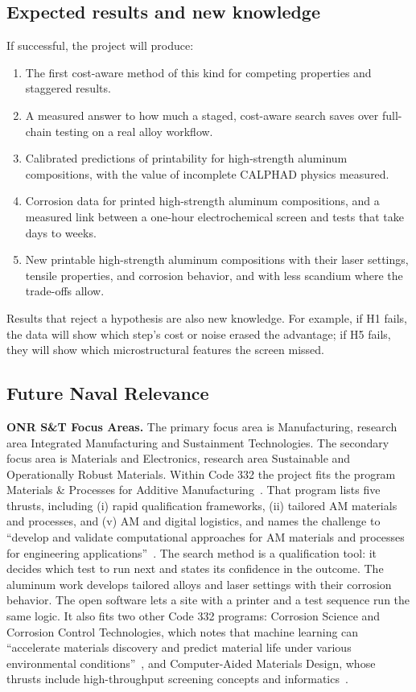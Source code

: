 \documentclass[12pt,letterpaper]{article}
\begin{document}
\subsection{Expected results and new knowledge}

If successful, the project will produce:
\begin{enumerate}\setlength{\itemsep}{0pt}
\item The first cost-aware method of this kind for competing properties and
staggered results.
\item A measured answer to how much a staged, cost-aware search saves over
full-chain testing on a real alloy workflow.
\item Calibrated predictions of printability for high-strength aluminum
compositions, with the value of incomplete CALPHAD physics measured.
\item Corrosion data for printed high-strength aluminum compositions, and a
measured link between a one-hour electrochemical screen and tests that take
days to weeks.
\item New printable high-strength aluminum compositions with their laser
settings, tensile properties, and corrosion behavior, and with less scandium
where the trade-offs allow.
\end{enumerate}
Results that reject a hypothesis are also new knowledge. For example, if H1
fails, the data will show which step's cost or noise erased the advantage; if
H5 fails, they will show which microstructural features the screen missed.

\subsection{Future Naval Relevance}
\label{sec:naval}

\textbf{ONR S\&T Focus Areas.} The primary focus area is Manufacturing,
research area Integrated Manufacturing and Sustainment Technologies. The
secondary focus area is Materials and Electronics, research area Sustainable
and Operationally Robust Materials. Within Code 332 the project fits the
program Materials \& Processes for Additive Manufacturing~\cite{onram}. That
program lists five thrusts, including (i) rapid qualification frameworks,
(ii) tailored AM materials and processes, and (v) AM and digital logistics,
and names the challenge to ``develop and validate computational approaches
for AM materials and processes for engineering applications''~\cite{onram}.
The search method is a qualification tool: it decides which test to run next
and states its confidence in the outcome. The aluminum work develops tailored
alloys and laser settings with their corrosion behavior. The open software
lets a site with a printer and a test sequence run the same logic. It also fits two
other Code 332 programs: Corrosion Science and Corrosion Control
Technologies, which notes that machine learning can ``accelerate materials
discovery and predict material life under various environmental
conditions''~\cite{onrcorr}, and Computer-Aided Materials Design, whose
thrusts include high-throughput screening concepts and
informatics~\cite{onrcamd}.
\end{document}
